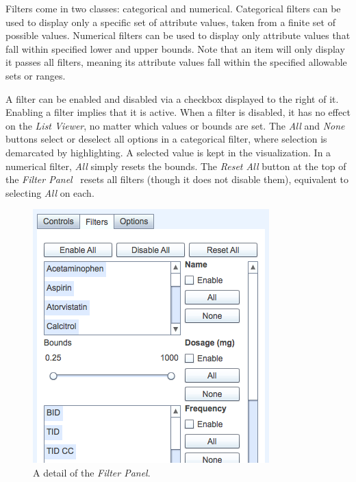 \documentclass{chi2009}
\newcommand{\ListViewer}{\textit{List Viewer}}
\newcommand{\Filters}{\textit{Filter Panel}}
\begin{document}
Filters come in two classes: categorical and numerical. Categorical filters can be used to display only a specific set of attribute values, taken from a finite set of possible values. Numerical filters can be used to display only attribute values that fall within specified lower and upper bounds. Note that an item will only display it passes all filters, meaning its attribute values fall within the specified allowable sets or ranges.

A filter can be enabled and disabled via a checkbox displayed to the right of it. Enabling a filter implies that it is active. When a filter is disabled, it has no effect on the \ListViewer, no matter which values or bounds are set. The \textit{All} and \textit{None} buttons select or deselect all options in a categorical filter, where selection is demarcated by highlighting. A selected value is kept in the visualization. In a numerical filter, \textit{All} simply resets the bounds. The \textit{Reset All} button at the top of the \Filters~ resets all filters (though it does not disable them), equivalent to selecting \textit{All} on each.

\begin{figure}[t]
\begin{center}
\includegraphics[width=1\linewidth]{img/filters2.png}
\end{center}
   \caption{A detail of the \Filters.}
   \label{fig:filters}
\end{figure}
\end{document}
